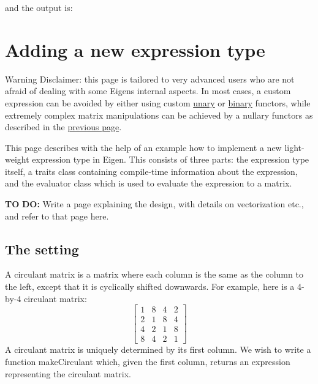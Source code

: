 \begin{DoxyCodeInclude}
\end{DoxyCodeInclude}
 and the output is\+:


\begin{DoxyCodeInclude}
\end{DoxyCodeInclude}
\hypertarget{TopicNewExpressionType}{}\section{Adding a new expression type}\label{TopicNewExpressionType}
\begin{DoxyWarning}{Warning}
Disclaimer\+: this page is tailored to very advanced users who are not afraid of dealing with some Eigen\textquotesingle{}s internal aspects. In most cases, a custom expression can be avoided by either using custom \hyperlink{group___core___module_a03db69599e5dc10f9b7524bbdd0bdcbb}{unary} or \hyperlink{group___core___module_a62e662227f0ef8ce077a44a46510507d}{binary} functors, while extremely complex matrix manipulations can be achieved by a nullary functors as described in the \hyperlink{TopicCustomizing_NullaryExpr}{previous page}.
\end{DoxyWarning}
This page describes with the help of an example how to implement a new light-\/weight expression type in Eigen. This consists of three parts\+: the expression type itself, a traits class containing compile-\/time information about the expression, and the evaluator class which is used to evaluate the expression to a matrix.

{\bfseries TO} {\bfseries DO\+:} Write a page explaining the design, with details on vectorization etc., and refer to that page here.\hypertarget{_topic_new_expression_type_TopicSetting}{}\subsection{The setting}\label{_topic_new_expression_type_TopicSetting}
A circulant matrix is a matrix where each column is the same as the column to the left, except that it is cyclically shifted downwards. For example, here is a 4-\/by-\/4 circulant matrix\+: \[ \begin{bmatrix} 1 & 8 & 4 & 2 \\ 2 & 1 & 8 & 4 \\ 4 & 2 & 1 & 8 \\ 8 & 4 & 2 & 1 \end{bmatrix} \] A circulant matrix is uniquely determined by its first column. We wish to write a function {\ttfamily make\+Circulant} which, given the first column, returns an expression representing the circulant matrix.

